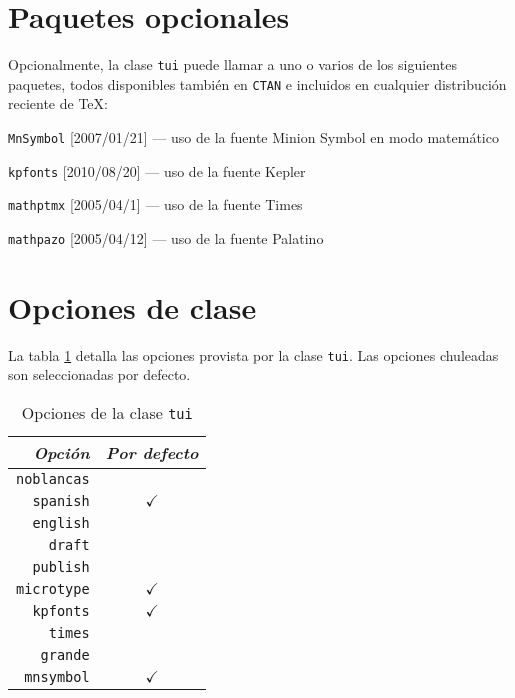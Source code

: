 \documentclass[11pt,
              article,
              oneside
              ]{memoir}
\newcommand*{\paquete}[1]{\texttt{\color{NavyBlue}#1}\xspace}
\newcommand*{\tui}{{\normalfont\paquete{tui}}\xspace}
\begin{document}
\section{Paquetes opcionales}
\noindent
Opcionalmente, la clase \tui puede llamar a uno o varios de los siguientes paquetes, todos disponibles también en \paquete{CTAN} e incluidos en cualquier distribución reciente de \TeX:
\medskip  
\begin{compactenum}
  \item \paquete{MnSymbol} [2007/01/21] --- uso de la fuente Minion Symbol en modo matemático
  \item \paquete{kpfonts} [2010/08/20] --- uso de la fuente Kepler
  \item \paquete{mathptmx} [2005/04/1]  --- uso de la fuente Times
  \item \paquete{mathpazo} [2005/04/12]  --- uso de la fuente Palatino
\end{compactenum}



\section{Opciones de clase}
\renewcommand*{\tablename}{Tabla}
\noindent
La tabla \ref{tab:opciones} detalla las opciones provista por la clase \tui. Las opciones chuleadas son seleccionadas por defecto.
\begin{table}
  \begin{center}
    \begin{tabular}{r|c}
      \textit{Opción} & \textit{Por defecto}\\
      \hline
    \texttt{noblancas} &  \\
    \texttt{spanish} & $\checkmark$ \\
    \texttt{english} &  \\
    \texttt{draft} &  \\
    \texttt{publish} &  \\
    \texttt{microtype} & $\checkmark$ \\
    \texttt{kpfonts} & $\checkmark$ \\
    \texttt{times} &  \\
    \texttt{grande} &  \\
    \texttt{mnsymbol} & $\checkmark$ \\
      \hline
    \end{tabular}
    \caption{Opciones de la clase \tui}\label{tab:opciones}
  \end{center}
\end{table}
\end{document}
